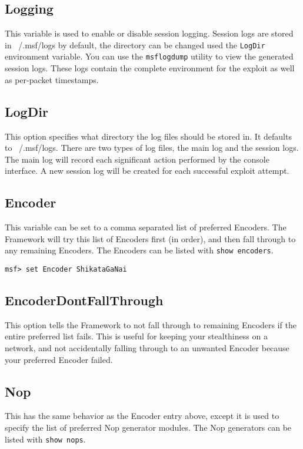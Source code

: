 \documentclass{report}
\begin{document}
	\subsection{Logging}
\par
This variable is used to enable or disable session logging. Session logs are
stored in ~/.msf/logs by default, the directory can be changed used the
\texttt{LogDir} environment variable. You can use the \texttt{msflogdump}
utility to view the generated session logs. These logs contain the complete
environment for the exploit as well as per-packet timestamps.  

	\subsection{LogDir}
\par
This option specifies what directory the log files should be stored in. It
defaults to ~/.msf/logs. There are two types of log files, the main log and the
session logs. The main log will record each significant action performed by the
console interface. A new session log will be created for each successful exploit
attempt.  

	\subsection{Encoder}
\par
This variable can be set to a comma separated list of preferred Encoders. The
Framework will try this list of Encoders first (in order), and then fall through
to any remaining Encoders. The Encoders can be listed with \texttt{show encoders}.  

\begin{verbatim}
msf> set Encoder ShikataGaNai
\end{verbatim}

	\subsection{EncoderDontFallThrough}
\par
This option tells the Framework to not fall through to remaining Encoders if the
entire preferred list fails.  This is useful for keeping your stealthiness on a
network, and not accidentally falling through to an unwanted Encoder because
your preferred Encoder failed.  

	\subsection{Nop}
\par
This has the same behavior as the Encoder entry above, except it is used to
specify the list of preferred Nop generator modules. The Nop generators can be
listed with \texttt{show nops}.  
\end{document}
